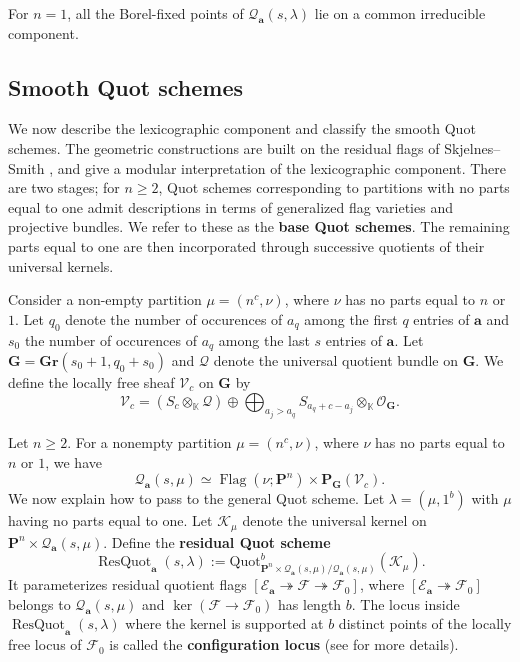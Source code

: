 \documentclass[leqno,11pt,a4paper]{amsart}
\newenvironment{customthm}[1]
  {\renewcommand\theinnercustomthm{#1}\innercustomthm}
  {\endinnercustomthm}
\theoremstyle{definition}
\numberwithin{equation}{section}
\newcommand{\Gr}{\mathbf{Gr}}
\newcommand{\kk}{\mathbb{K}}
\newcommand{\bfa}{\mathbf{a}}
\newcommand{\Quot}{\mathrm{Quot}}
\newcommand{\PP}{\mathbf{P}}
\newcommand{\EE}{\mathscr{E}}
\newcommand{\FF}{\mathscr{F}}
\newcommand{\OO}{\mathscr{O}}
\newcommand{\QQ}{\mathcal{Q}}
\DeclareMathOperator{\Flag}{Flag}
\DeclareMathOperator{\ResQuot}{ResQuot}
\begin{document}
\begin{customthm}{B}
For $n=1$, all the Borel-fixed points of $\QQ_{\bfa}(s,\lambda)$ lie on a common irreducible component.
\end{customthm}

\subsection{Smooth Quot schemes}
We now describe the lexicographic component and classify the smooth Quot schemes. 
The geometric constructions are built on the residual flags of Skjelnes--Smith \cite{SS23}, and give a modular interpretation of the lexicographic component. 
There are two stages; for $n\geq 2$, Quot schemes corresponding to partitions with no parts equal to one admit descriptions in terms of generalized flag varieties and projective bundles. 
We refer to these as the \textbf{base Quot schemes}. 
The remaining parts equal to one are then incorporated through successive quotients of their universal kernels.


Consider a non-empty partition $\mu = (n^c,\nu)$, where $\nu$ has no parts equal to $n$ or $1$. 
Let $q_0$ denote the number of occurences of $a_q$ among the first $q$ entries of $\bfa$ and $s_0$ the number of occurences of $a_q$ among the last $s$ entries of $\bfa$.
Let $\mathbf{G}=\Gr(s_0+1,q_0+s_0)$ and  $\mathscr{Q}$ denote the universal quotient bundle on $\mathbf{G}$. 
We define the locally free sheaf $\mathscr V_c$ on $\mathbf{G}$ by
$$
\mathscr V_c=
(S_c\otimes_\kk \mathscr{Q}) \oplus \bigoplus_{a_j>a_q} S_{a_q+c-a_j}\otimes_\kk\OO_{\mathbf G}.
$$

\begin{customthm}{C} 
Let $n\geq 2$. 
For a nonempty partition $\mu = (n^c,\nu)$, where $\nu$ has no parts equal to $n$ or $1$, we have
$$
\QQ_{\bfa}(s,\mu) \simeq \Flag(\nu;\PP^n)\times\PP_{\mathbf G}(\mathscr V_c).
$$
\end{customthm}
We now explain how to pass to the general Quot scheme. 
Let $\lambda = (\mu,1^b)$ with $\mu$ having no parts equal to one.
Let $\mathscr{K}_\mu$ denote the universal kernel on $\PP^n\times\QQ_{\bfa}(s,\mu)$.
Define the \textbf{residual Quot scheme}
$$
\ResQuot_{\bfa}(s,\lambda)
:= \Quot^b_{\PP^n\times\QQ_{\bfa}(s,\mu)/ \QQ_{\bfa}(s,\mu)}(\mathscr K_\mu).
$$
It parameterizes residual quotient flags $ [\EE_{\bfa}\twoheadrightarrow\FF  \twoheadrightarrow\FF_0]$,
where $[\EE_{\bfa} \twoheadrightarrow \FF_0]$ belongs to $\QQ_{\bfa}(s,\mu)$ and $\ker(\FF \to \FF_0)$ has length $b$.
The locus inside $\ResQuot_{\bfa}(s,\lambda)$ where the kernel is supported at $b$ distinct points of the locally free locus of $\FF_0$ is called the \textbf{configuration locus} (see  for more details).
\end{document}
